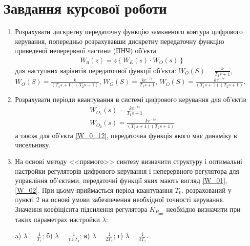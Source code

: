 \section{Завдання курсової роботи}
\begin{enumerate}
    \item Розрахувати дискретну передаточну функцію замкненого контура 
        цифрового керування, попередньо розрахувавши дискретну передаточну 
        функцію приведеної неперервної частини (ПНЧ) об'єкта
        \begin{gather}
            W_\text{п}(z) = z \left\{W_E(s) \cdot W_O(s) \right\}
        \end{gather} 
        для наступних варіантів передаточної функції об'єкта:
        $W_O(S) = \frac{k}{T_1 s + 1}$, $W_O(S) = \frac{k}{(T_1 s + 1)(T_2 s + 1)}$, 
        $W_O(S) = \frac{k e^{-\tau s}}{T_1 s + 1}$, $W_O(S) = \frac{k e^{-\tau s}}{(T_1 s + 1)(T_2 s + 1)}$.
    \item Розрахувати періоди квантування в системі цифрового керування для об'єктів
        \begin{gather}\label{W_01}
            W_{O_1}(s) = \frac{k e^{-\tau s}}{T_1 s + 1} \\
            \label{W_02}
            W_{O_2}(s) = \frac{k e^{-\tau s}}{(T_1 s + 1)(T_2 s + 1)}
        \end{gather}
        а також для об'єкта \eqref{W_0_12}, передаточна функція якого має динаміку в чисельнику.
    \item На основі методу <<прямого>> синтезу визначити структуру і оптимальні настройки регуляторів цифрового керування і неперервного
        регулятора для управління об'єктами, передаточні функції яких мають вигляд \eqref{W_01}, \eqref{W_02}. 
        При цьому приймається період квантування $T_0$, розрахований у пункті 2 на основі умови забезпечення необхідної точності керування.
        Значення коефіцієнта підсилення регулятора
        $K_{P_\text{опт}}$ необхідно визначити при таких параметрах настройки $\lambda$:

        a) $\lambda = \frac{1}{T_1}$; б) $\lambda = \frac{1}{1.5 T_1}$; в) $\lambda = \frac{1}{2T_1}$; г) $\lambda = \frac{1}{3T_1}$.


\end{enumerate}
